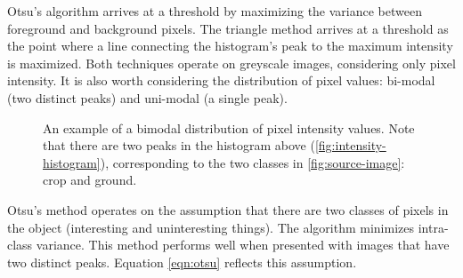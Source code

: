\documentclass[letterpaper, notitlepage]{report}
\begin{document}
{ Otsu's algorithm arrives at a threshold by maximizing the variance between foreground and background pixels. The triangle method arrives at a threshold as the point where a line connecting the histogram’s peak to the maximum intensity is maximized. Both techniques operate on greyscale images, considering only pixel intensity. 
It is also worth considering the distribution of pixel values: bi-modal (two distinct peaks) and uni-modal (a single peak).

%

\begin{figure}[h]
	\centering
		\hfil
	\caption[Bimodal distribution of pixel intensity]{An example of a bimodal distribution of pixel intensity values. Note that there are two peaks in the histogram above (\ref{fig:intensity-histogram}), corresponding to the two classes in \ref{fig:source-image}: crop and ground.}
	\label{fig:intensity}
\end{figure}

Otsu's method operates on the assumption that there are two classes of pixels in the object (interesting and uninteresting things). The algorithm minimizes intra-class variance. This method performs well when presented with images that have two distinct peaks. Equation \ref{eqn:otsu} reflects this assumption.

}
\end{document}
